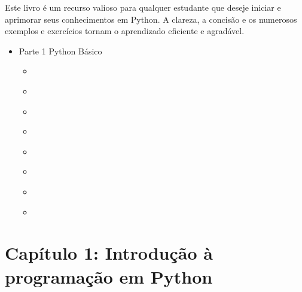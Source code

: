 \documentclass[letterpaper,10pt,english]{jupyterBook}
\begin{document}
\sphinxAtStartPar
Este livro é um recurso valioso para qualquer estudante que deseje iniciar e aprimorar seus conhecimentos em Python. A clareza, a concisão e os numerosos exemplos e exercícios tornam o aprendizado eficiente e agradável.
\begin{itemize}
\item {} 
\sphinxAtStartPar
Parte 1 \sphinxhyphen{} Python Básico

\begin{itemize}
\item {} 
\sphinxAtStartPar
{\hyperref[\detokenize{chapters/ch1/ch1::doc}]{}}

\item {} 
\sphinxAtStartPar
{\hyperref[\detokenize{chapters/ch2/ch2::doc}]{}}

\item {} 
\sphinxAtStartPar
{\hyperref[\detokenize{chapters/ch3/ch3::doc}]{}}

\item {} 
\sphinxAtStartPar
{\hyperref[\detokenize{chapters/ch4/ch4::doc}]{}}

\item {} 
\sphinxAtStartPar
{\hyperref[\detokenize{chapters/ch5/ch5::doc}]{}}

\item {} 
\sphinxAtStartPar
{\hyperref[\detokenize{chapters/ch6/ch6::doc}]{}}

\item {} 
\sphinxAtStartPar
{\hyperref[\detokenize{chapters/ch7/ch7::doc}]{}}

\item {} 
\sphinxAtStartPar
{\hyperref[\detokenize{chapters/ch8/ch8::doc}]{}}

\end{itemize}
\end{itemize}

\sphinxstepscope


\chapter{Capítulo 1: Introdução à programação em Python}
\label{\detokenize{chapters/ch1/ch1:capitulo-1-introducao-a-programacao-em-python}}\label{\detokenize{chapters/ch1/ch1::doc}}
\end{document}
